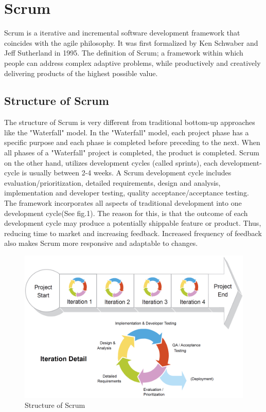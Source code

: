 \section{Scrum}
Scrum is a iterative and incremental software development framework that coincides with the agile philosophy. It was first formalized by Ken Schwaber and Jeff Sutherland in 1995. The definition of Scrum; a framework within which people can address complex adaptive problems, while productively and creatively delivering products of the highest possible value\cite{Scrumguides}. 
\subsection{Structure of Scrum}
The structure of Scrum is very different from traditional bottom-up approaches like the "Waterfall" model. In the "Waterfall" model, each project phase has a specific purpose and each phase is completed before preceding to the next. When all phases of a "Waterfall" project is completed, the product is completed. Scrum on the other hand, utilizes development cycles (called sprints), each development-cycle is usually between 2-4 weeks. A Scrum development cycle includes evaluation/prioritization, detailed requirements, design and analysis, implementation and developer testing, quality acceptance/acceptance testing. The framework incorporates all aspects of traditional development into one development cycle(See fig.1). The reason for this, is that the outcome of each development cycle may produce a potentially shippable feature or product. Thus, reducing time to market and increasing feedback. Increased frequency of feedback also makes Scrum more responsive and adaptable to changes.   

\begin{figure}[H]
\includegraphics[scale=0.81]{VAPIQ-PICTURES/ScrumProcess.PNG}
 \caption{Structure of Scrum}
 \label{Structure of Scrum}
\end{figure}


